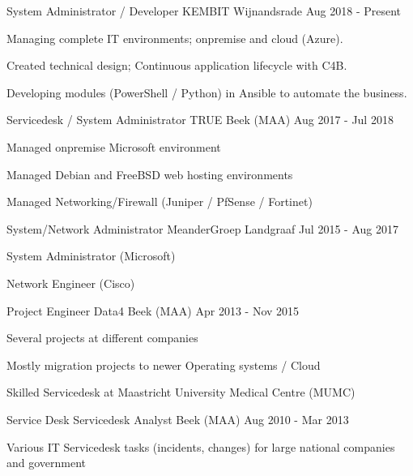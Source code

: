 \documentclass[11pt, letterpaper]{awesome-cv}
\begin{document}
\begin{cventries}


  \cventry
    {System Administrator / Developer}
    {KEMBIT}
    {Wijnandsrade}
    {Aug 2018 - Present}
    {
      \begin{cvitems}
        \item{Managing complete IT environments; onpremise and cloud (Azure).}
        \item{Created technical design; Continuous application lifecycle with C4B.}
        \item{Developing modules (PowerShell / Python) in Ansible to automate the business.}
      \end{cvitems}
    }


  \cventry
    {Servicedesk / System Administrator}
    {TRUE}
    {Beek (MAA)}
    {Aug 2017 - Jul 2018}
    {
      \begin{cvitems}
        \item{Managed onpremise Microsoft environment}
        \item{Managed Debian and FreeBSD web hosting environments}
        \item{Managed Networking/Firewall (Juniper / PfSense / Fortinet)}
      \end{cvitems}
    }


  \cventry
    {System/Network Administrator}
    {MeanderGroep}
    {Landgraaf}
    {Jul 2015 - Aug 2017}
    {
      \begin{cvitems}
        \item{System Administrator (Microsoft)}
        \item{Network Engineer (Cisco)}
      \end{cvitems}
    }


  \cventry
    {Project Engineer}
    {Data4}
    {Beek (MAA)}
    {Apr 2013 - Nov 2015}
    {
      \begin{cvitems}
        \item{Several projects at different companies}
        \item{Mostly migration projects to newer Operating systems / Cloud}
        \item{Skilled Servicedesk at Maastricht University Medical Centre (MUMC)}
      \end{cvitems}
    }


  \cventry
    {Service Desk}
    {Servicedesk Analyst}
    {Beek (MAA)}
    {Aug 2010 - Mar 2013}
    {
      \begin{cvitems}
        \item{Various IT Servicedesk tasks (incidents, changes) for large national companies and government}
      \end{cvitems}
    }



\end{cventries}
\end{document}
